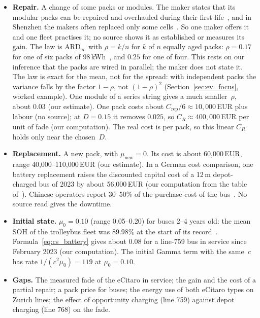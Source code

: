 \documentclass[11pt,a4paper]{article}
\theoremstyle{plain}
\theoremstyle{definition}
\theoremstyle{remark}
\begin{document}
\begin{itemize}
    The energy fit rests on two Zurich lines of one lighter 12\,m bus with a diesel heater~\cite[p.~35]{VBZ2019}, so $k_\theta$ is an order of magnitude (our reading).
    The library adds damage only on mission periods, so the calendar fade of the depot periods is lost; it is small against the uncertainty of~$c_{\mathrm{cal}}$ (our reading).
    The eCitaro G of line 768 needs its own $e_0$, $k_\theta$ and $E_{\mathrm{nom}} = 550$\,kWh usable; no source read gives its energy use.
  \item \textbf{Repair.}
    A change of some packs or modules.
    The maker states that its modular packs can be repaired and overhauled during their first life~\cite{DaimlerTruck2025NMC4}, and in Shenzhen the makers often replaced only some cells~\cite[p.~70]{WorldBank2021Shenzhen}.
    So one maker offers it and one fleet practises it; no source shows it as established or measures its gain.
    The law is $\text{ARD}_\infty$ with $\rho = k/n$ for $k$ of $n$ equally aged packs: $\rho = 0.17$ for one of six packs of 98\,kWh~\cite{DaimlerTruck2022eCitaro}, and $0.25$ for one of four.
    This rests on our inference that the packs are wired in parallel; the maker does not state it.
    The law is exact for the mean, not for the spread: with independent packs the variance falls by the factor $1-\rho$, not $(1-\rho)^2$ (Section~\ref{sec:ev_focus}, worked example).
    One module of a series string gives a much smaller~$\rho$, about $0.03$ (our estimate).
    One pack costs about $C_{\mathrm{rep}}/6 \approx 10{,}000$\,EUR plus labour (no source); at $D = 0.15$ it removes $0.025$, so $C_R \approx 400{,}000$\,EUR per unit of fade (our computation).
    The real cost is per pack, so this linear $C_R$ holds only near the chosen~$D$.
  \item \textbf{Replacement.}
    A new pack, with $\mu_{\mathrm{new}} = 0$.
    Its cost is about 60,000\,EUR, range 40,000--110,000\,EUR (our estimate).
    In a German cost comparison, one battery replacement raises the discounted capital cost of a 12\,m depot-charged bus of 2023 by about 56,000\,EUR (our computation from the table of~\cite[p.~377]{PwC2024ebus}).
    Chinese operators report 30--50\% of the purchase cost of the bus~\cite[p.~5]{Mao2024ICCT}.
    No source read gives the downtime.
  \item \textbf{Initial state.}
    $\mu_0 = 0.10$ (range 0.05--0.20) for buses 2--4 years old: the mean SOH of the trolleybus fleet was 89.98\% at the start of its record~\cite[Table~10]{Malozyomov2026trolleybus}.
    Formula~\eqref{eq:cs_battery} gives about 0.08 for a line-759 bus in service since February 2023 (our computation).
    The initial Gamma term with the same~$c$ has rate $1/(c^2\mu_0) = 119$ at $\mu_0 = 0.10$.
  \item \textbf{Gaps.}
    The measured fade of the eCitaro in service; the gain and the cost of a partial repair; a pack price for buses; the energy use of both eCitaro types on Zurich lines; the effect of opportunity charging (line 759) against depot charging (line 768) on the fade.
\end{itemize}
\end{document}
